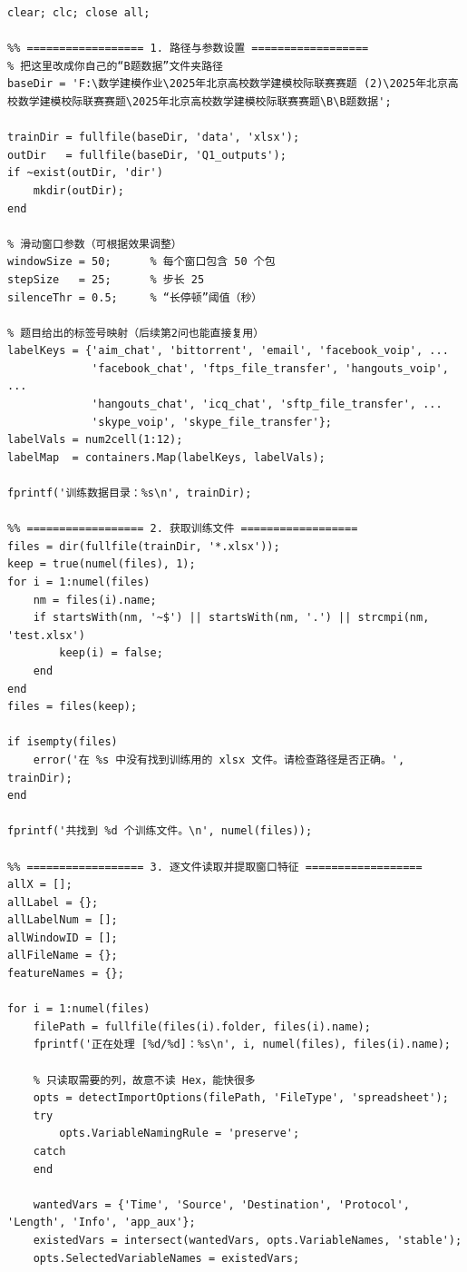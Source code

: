 \documentclass[UTF8,a4paper,12pt]{ctexart}
\begin{document}
\begin{lstlisting}
clear; clc; close all;

%% ================== 1. 路径与参数设置 ==================
% 把这里改成你自己的“B题数据”文件夹路径
baseDir = 'F:\数学建模作业\2025年北京高校数学建模校际联赛赛题 (2)\2025年北京高校数学建模校际联赛赛题\2025年北京高校数学建模校际联赛赛题\B\B题数据';

trainDir = fullfile(baseDir, 'data', 'xlsx');
outDir   = fullfile(baseDir, 'Q1_outputs');
if ~exist(outDir, 'dir')
    mkdir(outDir);
end

% 滑动窗口参数（可根据效果调整）
windowSize = 50;      % 每个窗口包含 50 个包
stepSize   = 25;      % 步长 25
silenceThr = 0.5;     % “长停顿”阈值（秒）

% 题目给出的标签号映射（后续第2问也能直接复用）
labelKeys = {'aim_chat', 'bittorrent', 'email', 'facebook_voip', ...
             'facebook_chat', 'ftps_file_transfer', 'hangouts_voip', ...
             'hangouts_chat', 'icq_chat', 'sftp_file_transfer', ...
             'skype_voip', 'skype_file_transfer'};
labelVals = num2cell(1:12);
labelMap  = containers.Map(labelKeys, labelVals);

fprintf('训练数据目录：%s\n', trainDir);

%% ================== 2. 获取训练文件 ==================
files = dir(fullfile(trainDir, '*.xlsx'));
keep = true(numel(files), 1);
for i = 1:numel(files)
    nm = files(i).name;
    if startsWith(nm, '~$') || startsWith(nm, '.') || strcmpi(nm, 'test.xlsx')
        keep(i) = false;
    end
end
files = files(keep);

if isempty(files)
    error('在 %s 中没有找到训练用的 xlsx 文件。请检查路径是否正确。', trainDir);
end

fprintf('共找到 %d 个训练文件。\n', numel(files));

%% ================== 3. 逐文件读取并提取窗口特征 ==================
allX = [];
allLabel = {};
allLabelNum = [];
allWindowID = [];
allFileName = {};
featureNames = {};

for i = 1:numel(files)
    filePath = fullfile(files(i).folder, files(i).name);
    fprintf('正在处理 [%d/%d]：%s\n', i, numel(files), files(i).name);

    % 只读取需要的列，故意不读 Hex，能快很多
    opts = detectImportOptions(filePath, 'FileType', 'spreadsheet');
    try
        opts.VariableNamingRule = 'preserve';
    catch
    end

    wantedVars = {'Time', 'Source', 'Destination', 'Protocol', 'Length', 'Info', 'app_aux'};
    existedVars = intersect(wantedVars, opts.VariableNames, 'stable');
    opts.SelectedVariableNames = existedVars;


\end{lstlisting}
\end{document}
